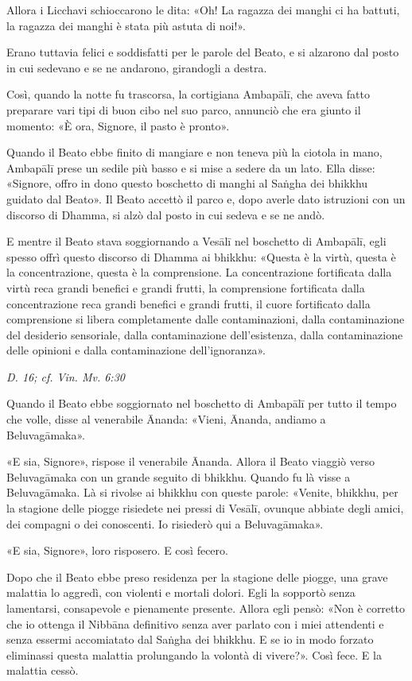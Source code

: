 Allora i Licchavi schioccarono le dita: «Oh! La ragazza dei manghi ci
ha battuti, la ragazza dei manghi è stata più astuta di noi!».


Erano tuttavia felici e soddisfatti per le parole del Beato, e si
alzarono dal posto in cui sedevano e se ne andarono, girandogli a
destra.


Così, quando la notte fu trascorsa, la cortigiana Ambapālī, che aveva
fatto preparare vari tipi di buon cibo nel suo parco, annunciò che era
giunto il momento: «È ora, Signore, il pasto è pronto».


Quando il Beato ebbe finito di mangiare e non teneva più la ciotola in
mano, Ambapālī prese un sedile più basso e si mise a sedere da un lato.
Ella disse: «Signore, offro in dono questo boschetto di manghi al Saṅgha
dei bhikkhu guidato dal Beato». Il Beato accettò il parco e, dopo averle
dato istruzioni con un discorso di Dhamma, si alzò dal posto in cui
sedeva e se ne andò.


E mentre il Beato stava soggiornando a Vesālī nel boschetto di Ambapālī,
egli spesso offrì questo discorso di Dhamma ai bhikkhu: «Questa è la
virtù, questa è la concentrazione, questa è la comprensione. La
concentrazione fortificata dalla virtù reca grandi benefici e grandi
frutti, la comprensione fortificata dalla concentrazione reca grandi
benefici e grandi frutti, il cuore fortificato dalla comprensione si
libera completamente dalle contaminazioni, dalla contaminazione del
desiderio sensoriale, dalla contaminazione dell’esistenza, dalla
contaminazione delle opinioni e dalla contaminazione dell’ignoranza».


\emph{D. 16; cf. Vin. Mv. 6:30}


Quando il Beato ebbe soggiornato nel boschetto di Ambapālī per tutto il
tempo che volle, disse al venerabile Ānanda: «Vieni, Ānanda, andiamo a
Beluvagāmaka».


«E sia, Signore», rispose il venerabile Ānanda. Allora il Beato viaggiò
verso Beluvagāmaka con un grande seguito di bhikkhu. Quando fu là visse
a Beluvagāmaka. Là si rivolse ai bhikkhu con queste parole: «Venite,
bhikkhu, per la stagione delle piogge risiedete nei pressi di Vesālī,
ovunque abbiate degli amici, dei compagni o dei conoscenti. Io risiederò
qui a Beluvagāmaka».


«E sia, Signore», loro risposero. E così fecero.


Dopo che il Beato ebbe preso residenza per la stagione delle piogge, una
grave malattia lo aggredì, con violenti e mortali dolori. Egli la
sopportò senza lamentarsi, consapevole e pienamente presente. Allora
egli pensò: «Non è corretto che io ottenga il Nibbāna definitivo senza
aver parlato con i miei attendenti e senza essermi accomiatato dal
Saṅgha dei bhikkhu. E se io in modo forzato eliminassi questa malattia
prolungando la volontà di vivere?». Così fece. E la malattia cessò.


